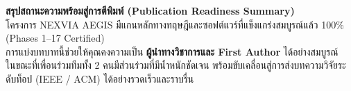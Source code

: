 \documentclass[10pt,a4paper]{article}
\begin{document}
\begin{center}
\begin{tcolorbox}[colback=primary!5!white, colframe=primary, arc=3mm, width=0.98\textwidth]
  \centering
  \textbf{\large สรุปสถานะความพร้อมสู่การตีพิมพ์ (Publication Readiness Summary)}\\[4pt]
  \small
  โครงการ NEXVIA AEGIS มีแกนหลักทางทฤษฎีและซอฟต์แวร์ที่แข็งแกร่งสมบูรณ์แล้ว 100\% (Phases 1--17 Certified)\\
  การแบ่งบทบาทนี้ช่วยให้คุณคงความเป็น \textbf{ผู้นำทางวิชาการและ First Author} ได้อย่างสมบูรณ์\\
  ในขณะที่เพื่อนร่วมทีมทั้ง 2 คนมีส่วนร่วมที่มีน้ำหนักชัดเจน พร้อมขับเคลื่อนสู่การส่งบทความวิจัยระดับท็อป (IEEE / ACM) ได้อย่างรวดเร็วและราบรื่น
\end{tcolorbox}
\end{center}
\end{document}
